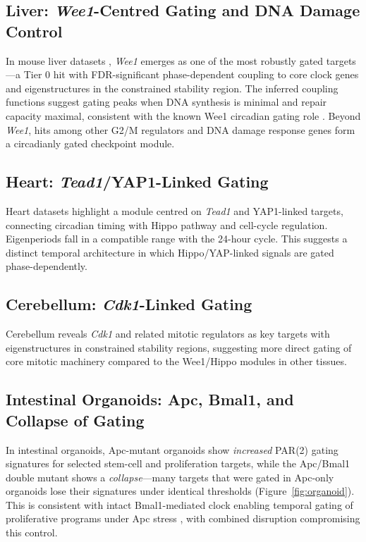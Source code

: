 \documentclass[11pt,letterpaper]{article}
\begin{document}
\subsection{Liver: \textit{Wee1}-Centred Gating and DNA Damage Control}

In mouse liver datasets \citep{zhang2014circadian, hughes2009harmonics}, \textit{Wee1} emerges as one of the most robustly gated targets---a Tier 0 hit with FDR-significant phase-dependent coupling to core clock genes and eigenstructures in the constrained stability region. The inferred coupling functions suggest gating peaks when DNA synthesis is minimal and repair capacity maximal, consistent with the known Wee1 circadian gating role \citep{matsuo2003control}. Beyond \textit{Wee1}, hits among other G2/M regulators and DNA damage response genes form a circadianly gated checkpoint module.

\subsection{Heart: \textit{Tead1}/YAP1-Linked Gating}

Heart datasets highlight a module centred on \textit{Tead1} and YAP1-linked targets, connecting circadian timing with Hippo pathway and cell-cycle regulation. Eigenperiods fall in a compatible range with the 24-hour cycle. This suggests a distinct temporal architecture in which Hippo/YAP-linked signals are gated phase-dependently.

\subsection{Cerebellum: \textit{Cdk1}-Linked Gating}

Cerebellum reveals \textit{Cdk1} and related mitotic regulators as key targets with eigenstructures in constrained stability regions, suggesting more direct gating of core mitotic machinery compared to the Wee1/Hippo modules in other tissues.

\subsection{Intestinal Organoids: Apc, Bmal1, and Collapse of Gating}

In intestinal organoids, Apc-mutant organoids show \textit{increased} PAR(2) gating signatures for selected stem-cell and proliferation targets, while the Apc/Bmal1 double mutant shows a \textit{collapse}---many targets that were gated in Apc-only organoids lose their signatures under identical thresholds (Figure~\ref{fig:organoid}). This is consistent with intact Bmal1-mediated clock enabling temporal gating of proliferative programs under Apc stress \citep{bunger2000mop3}, with combined disruption compromising this control.
\end{document}
